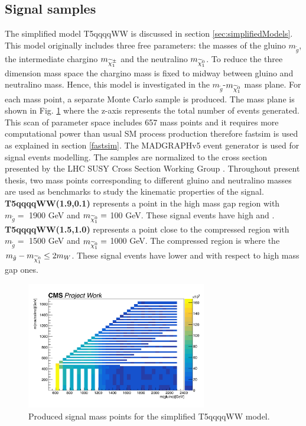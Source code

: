 \subsection{Signal samples}
\label{signalSamples}
The simplified model T5qqqqWW is discussed in section  \ref{sec:simplifiedModels}. This model originally includes three free parameters: the masses of the gluino $m_{\tilde{g}}$, the intermediate chargino $m_{\widetilde{\chi}^{\pm}_1}$ and the neutralino $m_{\widetilde{\chi}^0_1}$. To reduce the three dimension mass space the chargino mass is fixed to midway between gluino and neutralino mass. Hence, this model is investigated in the $m_{\tilde{g}}$-$m_{\widetilde{\chi}^0_1}$ mass plane. For each mass point, a separate Monte Carlo sample is produced. The mass plane is shown in  Fig. \ref{fig:massplane} where the z-axis represents the total number of events generated. This scan of parameter space includes 657 mass points and it requires more computational power than usual SM process production therefore fastsim is used as explained in section \ref{fastsim}. The MADGRAPHv5 event generator is used for signal events modelling. The samples are normalized to the cross section presented by the LHC SUSY Cross Section Working Group \cite{gluxsec2}.
Throughout present thesis, two mass points corresponding to different gluino and neutralino masses are used as benchmarks to study the kinematic properties of the signal. 
\\
\textbf{T5qqqqWW(1.9,0.1)} represents a point in the high mass gap region with $m_{\tilde{g}}=$ 1900 GeV and $m_{\widetilde{\chi}^0_1}=$ 100 GeV. These signal events have high \HT and \LT.
\\
\textbf{T5qqqqWW(1.5,1.0)} represents a point close to the compressed region with $m_{\tilde{g}}=$ 1500 GeV and $m_{\widetilde{\chi}^0_1}=$ 1000 GeV.  The compressed region is where the $m_{\tilde{g}}-m_{\widetilde{\chi}^0_1}\leq2m_{W}$. These signal events have lower \HT and \LT with respect to high mass gap ones.

\begin{figure}[!hb]
  \includegraphics[width=0.7\textwidth]{Plots/signals/signal_scan.pdf}
\centering
  \caption{\label{fig:massplane} Produced signal mass points for the simplified T5qqqqWW model. 
  }
\end{figure}

